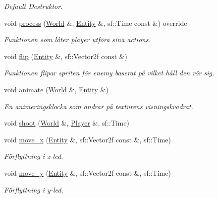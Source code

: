\begin{DoxyCompactItemize}
\begin{DoxyCompactList}\small\item\em Default Destruktor. \end{DoxyCompactList}\item 
void \hyperlink{classPlayer__Behaviour_aa88f449e71197691e1166e985f165fa6}{process} (\hyperlink{classWorld}{World} \&, \hyperlink{classEntity}{Entity} \&, sf\+::\+Time const \&) override
\begin{DoxyCompactList}\small\item\em Funktionen som låter player utföra sina actions. \end{DoxyCompactList}\item 
void \hyperlink{classPlayer__Behaviour_a286c0e64639b320704e3c0ea6b7dafd9}{flip} (\hyperlink{classEntity}{Entity} \&, sf\+::\+Vector2f const \&)
\begin{DoxyCompactList}\small\item\em Funktionen flipar spriten för enemy baserat på vilket håll den rör sig. \end{DoxyCompactList}\item 
void \hyperlink{classPlayer__Behaviour_a0731770843676863bceed9b7fe1033c7}{animate} (\hyperlink{classWorld}{World} \&, \hyperlink{classEntity}{Entity} \&)
\begin{DoxyCompactList}\small\item\em En animeringsklocka som ändrar på texturens visningskvadrat. \end{DoxyCompactList}\item 
void \hyperlink{classPlayer__Behaviour_ab2f7b0265a09d1f645231990c3ac3a27}{shoot} (\hyperlink{classWorld}{World} \&, \hyperlink{classPlayer}{Player} \&, sf\+::\+Time)
\item 
void \hyperlink{classPlayer__Behaviour_a6a440d70c136fb818db8606230bdcf1b}{move\+\_\+x} (\hyperlink{classEntity}{Entity} \&, sf\+::\+Vector2f const \&, sf\+::\+Time)
\begin{DoxyCompactList}\small\item\em Förflyttning i x-\/led. \end{DoxyCompactList}\item 
void \hyperlink{classPlayer__Behaviour_aca6d6268d1c798e0af747ca708393a76}{move\+\_\+y} (\hyperlink{classEntity}{Entity} \&, sf\+::\+Vector2f const \&, sf\+::\+Time)
\begin{DoxyCompactList}\small\item\em Förflyttning i y-\/led. \end{DoxyCompactList}\item 

\end{DoxyCompactItemize}

